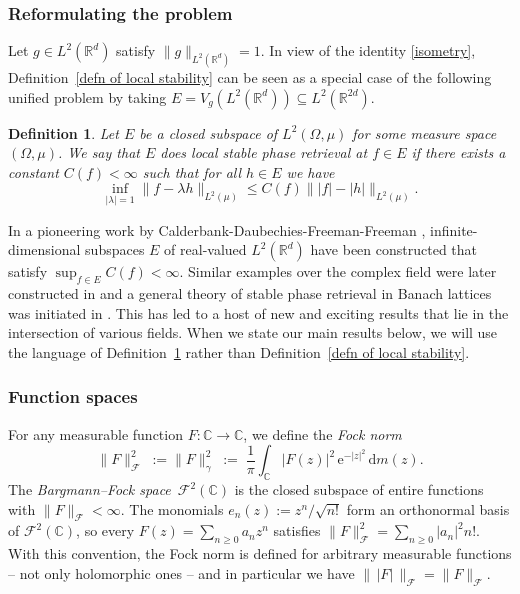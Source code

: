 \documentclass[11pt]{amsart}
\newtheorem{definition}[theorem]{Definition}
\theoremstyle{remark}
\begin{document}
\subsubsection{Reformulating the problem}
Let $g\in L^2(\mathbb{R}^d)$ satisfy $\|g\|_{ L^2(\mathbb{R}^d)}=1$. In view of the identity \eqref{isometry}, Definition~\ref{defn of local stability} can be seen as a special case of the following unified problem by taking $E=V_g(L^2(\mathbb{R}^{d}))\subseteq L^2(\mathbb{R}^{2d})$.

\begin{definition}\label{defn of local stability2}
    Let $E$ be a closed subspace of $L^2(\Omega,\mu)$ for some measure space $(\Omega,\mu)$. We say that $E$ does \emph{local stable phase retrieval at $f\in E$} if there exists a constant $C(f)<\infty$ such that for all $h\in E$ we have
    \begin{equation*}
        \inf_{|\lambda|=1}\|f-\lambda h\|_{L^2(\mu)}\leq C(f) \| |f|-|h|\|_{L^2(\mu)}.
    \end{equation*}
\end{definition}
In a pioneering work by Calderbank-Daubechies-Freeman-Freeman \cite{calderbank2022stable}, infinite-dimensional subspaces $E$ of real-valued $L^2(\mathbb{R}^d)$ have been constructed that satisfy $\sup_{f\in E}C(f)<\infty$. Similar examples over the complex field were later constructed in \cite{MR4837558} and a general theory of stable phase retrieval in Banach lattices was initiated in \cite{MR4800909}. This has led to a host of new and exciting results \cite{camunez2025characterization,garcia2025isometric,garcia2025existence} that lie in the intersection of various fields. When we state our main results below, we will use the language of Definition~\ref{defn of local stability2} rather than Definition~\ref{defn of local stability}.

\subsubsection{Function spaces} 

For any measurable function $F \colon \mathbb{C} \to \mathbb{C}$, we define the
\emph{Fock norm}
\[
\lVert F \rVert_{\mathcal{F}}^2
\;:=\lVert F \rVert_{\gamma}^2
\;:=\;
\frac{1}{\pi}\int_{\mathbb{C}} \lvert F(z) \rvert^2 \, \mathrm{e}^{-\lvert z \rvert^2}\,\mathrm{d} m(z).
\]
The \emph{Bargmann--Fock space}~$\mathcal{F}^2(\mathbb{C})$ is the closed subspace of entire functions with
$\lVert F \rVert_\mathcal{F} < \infty$.
The monomials $e_n(z) := z^n/\sqrt{n!}$ form an orthonormal basis of $\mathcal{F}^2(\mathbb{C})$, so every
$F(z) = \sum_{n \ge 0} a_n z^n$ satisfies
$\lVert F \rVert_{\mathcal{F}}^2 = \sum_{n \ge 0} \lvert a_n \rvert^2 n!$.
With this convention, the Fock norm is defined for arbitrary measurable
functions --  not only holomorphic ones -- and in particular we have
$\lVert \,\lvert F \rvert\, \rVert_\mathcal{F} = \lVert F \rVert_\mathcal{F}$.
\medskip
\end{document}
